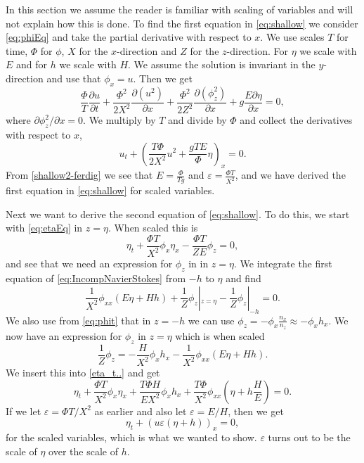 \documentclass[11pt]{article}
\begin{document}
In this section we assume the reader is familiar with scaling of variables and will not explain how this is done. To find the first equation in \eqref{eq:shallow} we consider \eqref{eq:phiEq} and take the partial derivative
with respect to $x$. We use scales $T$ for time, $\Phi$ for $\phi$, $X$ for the $x$-direction and $Z$ for the $z$-direction. For $\eta$ we scale with $E$ and for $h$ we scale with $H$. We assume the solution is
invariant in the $y$-direction and use that $\phi_x=u$. Then we get 
\begin{equation*}
\frac{\Phi}{T}\frac{\partial u}{\partial t} + \frac{\Phi^2}{2X^2}\frac{\partial (u^2)}{\partial x}+ \frac{\Phi^2}{2Z^2}\frac{\partial(\phi_z^2)}{\partial x} + g\frac{E \partial \eta}{\partial x} = 0,
\end{equation*}
where $\partial\phi_z^2/\partial x=0$. We multiply by $T$ and divide by $\Phi$ and collect the derivatives with respect to $x$,
\begin{equation}
    \label{shallow2-ferdig}
    u_t + \left(\frac{T\Phi}{2X^2}u^2 + \frac{gTE}{\Phi}\eta\right)_x = 0.
\end{equation}
From \eqref{shallow2-ferdig} we see that $E = \frac{\Phi}{T g}$ and $\varepsilon =\frac{\Phi T}{X^2}$, and we have derived the first equation in \eqref{eq:shallow} for scaled variables.

Next we want to derive the second equation of \eqref{eq:shallow}. To do this, we start with \eqref{eq:etaEq} in $z = \eta$. When scaled this is 
\begin{equation}
    \label{eta_t..}
    \eta_t + \frac{\Phi T}{X^2}\phi_x\eta_x - \frac{\Phi T}{ZE}\phi_z = 0,
\end{equation}
and see that we need an expression for $\phi_z$ in in $z = \eta$. We integrate the first equation of \eqref{eq:IncompNavierStokes} from $-h$ to $\eta$ and find 
\begin{equation*}    
    \frac{1}{X^2}\phi_{xx}(E\eta + Hh) + \frac{1}{Z}\phi_z|_{z=\eta} - \frac{1}{Z}\phi_z|_{-h} = 0.
\end{equation*}
We also use from \eqref{eq:phit} that in $z = -h$ we can use $\phi_z = -\phi_x\frac{n_x}{n_z} \approx -\phi_x h_x$. We now have an expression for $\phi_z$ in $z = \eta$ which is when scaled
\begin{equation*}
    \frac{1}{Z}\phi_z = - \frac{H}{X^2}\phi_x h_x - \frac{1}{X^2}\phi_{xx}(E\eta + Hh).
\end{equation*}
We insert this into \eqref{eta_t..} and get
\begin{equation*} 
    \eta_t + \frac{\Phi T}{X^2}\phi_x\eta_x + \frac{T\Phi H}{EX^2}\phi_x h_x + \frac{T\Phi}{X^2}\phi_{xx}(\eta + h\frac{H}{E}) = 0.
\end{equation*}
If we let $\varepsilon = \Phi T/X^2 $ as earlier and also let $\varepsilon = E/H$, then we get
\begin{equation*}
    \eta_t + (u\varepsilon(\eta + h))_x = 0,
\end{equation*}
for the scaled variables, which is what we wanted to show. $\varepsilon$ turns out to be the scale of $\eta$ over the scale of $h$.
%
%
\end{document}
